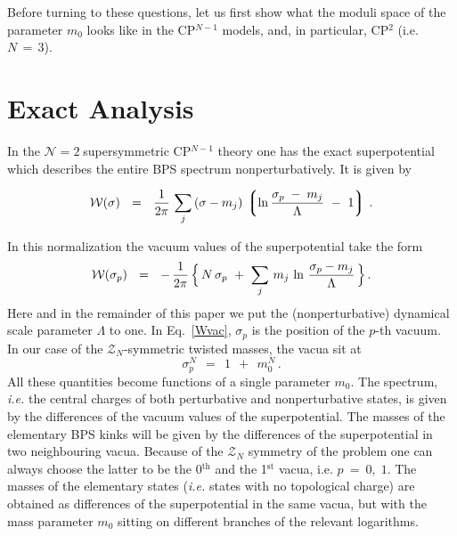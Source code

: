 \documentclass[epsfig,12pt]{article}
\def\beq{\begin{equation}}
\def\eeq{\end{equation}}
\newcommand{\ntwo}{${\mathcal N}=2\;$}
\def\beq{\begin{equation}}
\def\eeq{\end{equation}}
\newcommand{\mc}[1]{\mathcal{#1}}
\newcommand{\lgr}{\left\lgroup}
\newcommand{\rgr}{\right\rgroup}
\newcommand{\W}{\mathcal{W}}
\begin{document}
	Before turning to these questions,  let us first show what the moduli space of the parameter
	$ m_0 $ looks like in the CP$^{N-1}$ models, and, in particular, CP$^2$ (i.e. $ N \,=\, 3 $). 



\section{Exact Analysis}
\setcounter{equation}{0}
\label{exact}

	In the \ntwo supersymmetric CP$^{N-1}$ theory one has the exact superpotential which
	describes the entire BPS  spectrum nonperturbatively. It is given by \cite{W93,AdDVecSal,ChVa,HaHo}
	
\beq
	\W (\sigma) ~~=~~ \frac{1}{2\pi}\,
	\sum_j\,(\sigma - m_j)\, \lgr \ln \frac{\sigma_p \;-\; m_j}{\Lambda} ~-~ 1  \rgr\,.
\eeq


	In this normalization the vacuum values of the superpotential take the form
\beq
\label{Wvac}
	\W ( \sigma_p ) ~~=~~ 
		-\, \frac{1}{2\pi}\,  
                \Bigl\{\, N\, \sigma_p ~+~ \sum_j\, m_j\, \ln \,\frac{\sigma_p - m_j}{\Lambda} \,\Bigr\}\,.
\eeq
	Here and in the remainder of this paper we put the (nonperturbative) dynamical scale parameter $ \Lambda $ to one.
	In Eq.~\eqref{Wvac}, $ \sigma_p $ is the position of the $ p $-th vacuum.
	In our case of the $ \mc{Z}_N $-symmetric twisted masses, the vacua sit at
\beq
\label{sig}
	\sigma_p^N  ~~=~~ 1 ~~+~~ m_0^N \,.
\eeq
	All these quantities become functions of a single parameter $ m_0 $.
	The spectrum, {\it i.e.} the central charges of both perturbative and nonperturbative states,
	is given by the differences of the vacuum values of the superpotential.
	The masses of the elementary BPS kinks will be given by the differences of the superpotential in
	two neighbouring vacua.
	Because of the $ \mc{Z}_N $ symmetry of the problem one can always choose the latter to be 
	the 0$^\text{th}$ and the 1$^\text{st}$ vacua,  i.e. $ p ~=~ 0,\; 1 $.
	The masses of the elementary states ({\it i.e.} states with no topological charge) are obtained 
	as differences of the superpotential in the same vacua, but with the mass parameter $ m_0 $ 
	sitting on different branches of the relevant logarithms.
\end{document}
